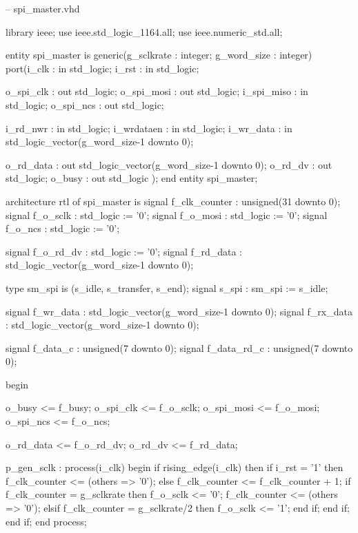 \begin{VHDLlisting}[tabsize=4]
-- spi_master.vhd

library ieee;
	use ieee.std_logic_1164.all;
	use ieee.numeric_std.all;
	
entity spi_master is
	generic(g_sclkrate  : integer;
			g_word_size : integer)
	port(i_clk      : in    std_logic;
		 i_rst      : in    std_logic;
		 
		 o_spi_clk  :   out std_logic;
		 o_spi_mosi :   out std_logic;
		 i_spi_miso : in    std_logic;
		 o_spi_ncs  :   out std_logic;
		
		 i_rd_nwr   : in    std_logic;
		 i_wrdataen : in    std_logic;
		 i_wr_data  : in    std_logic_vector(g_word_size-1 downto 0);
		
		 o_rd_data  :   out std_logic_vector(g_word_size-1 downto 0);
		 o_rd_dv    :   out std_logic;
		 o_busy     :   out std_logic	
	);
end entity spi_master;

architecture rtl of spi_master is
	signal f_clk_counter : unsigned(31 downto 0);
	signal f_o_sclk      : std_logic := '0';
	signal f_o_mosi      : std_logic := '0';
	signal f_o_ncs       : std_logic := '0';
	
	signal f_o_rd_dv     : std_logic := '0';
	signal f_rd_data     : std_logic_vector(g_word_size-1 downto 0);
	
	type sm_spi is (s_idle, s_transfer, s_end);
	signal s_spi         : sm_spi := s_idle;
	
	signal f_wr_data     : std_logic_vector(g_word_size-1 downto 0);
	signal f_rx_data     : std_logic_vector(g_word_size-1 downto 0);
	
	signal f_data_c      : unsigned(7 downto 0);
	signal f_data_rd_c   : unsigned(7 downto 0);
	
	
begin

	o_busy      <= f_busy;
	o_spi_clk   <= f_o_sclk; 
    o_spi_mosi  <= f_o_mosi;
    o_spi_ncs   <= f_o_ncs; 
	
	o_rd_data <= f_o_rd_dv;
	o_rd_dv   <= f_rd_data;

	p_gen_sclk : process(i_clk)
	begin
		if rising_edge(i_clk) then
			if i_rst = '1' then
				f_clk_counter <= (others => '0');
			else
				f_clk_counter <= f_clk_counter + 1;
				if f_clk_counter = g_sclkrate then
					f_o_sclk <= '0';
					f_clk_counter <= (others => '0');
				elsif f_clk_counter = g_sclkrate/2 then
					f_o_sclk <= '1';
				end if;
			end if;		
		end if;
	end process;


\end{VHDLlisting}
